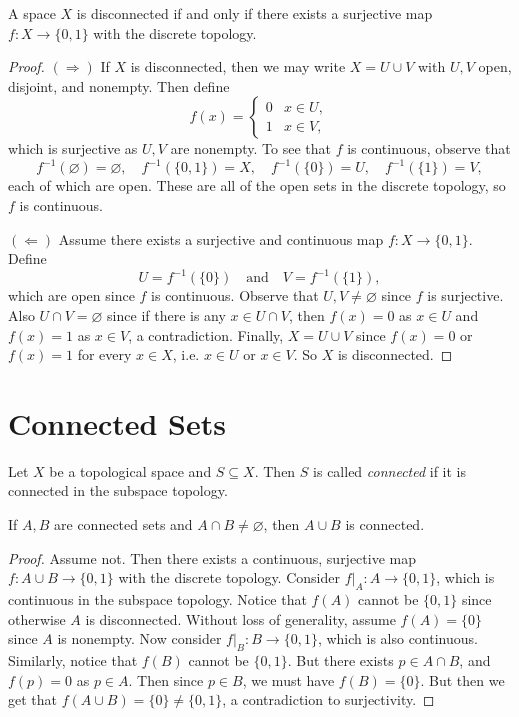 \begin{theorem}
  A space $X$ is disconnected if and only if
  there exists a surjective map
  $f : X \to \{0, 1\}$ with the discrete topology.
\end{theorem}

\begin{proof}
  $(\Rightarrow)$
  If $X$ is disconnected, then we may write
  $X = U \cup V$ with $U, V$ open, disjoint, and
  nonempty. Then define
  \[
    f(x) = \begin{cases}
      0 & x \in U, \\
      1 & x \in V,
    \end{cases}
  \]
  which is surjective as $U, V$ are nonempty. To
  see that $f$ is continuous, observe that
  \[
    f^{-1}(\varnothing) = \varnothing, \quad
    f^{-1}(\{0, 1\}) = X, \quad
    f^{-1}(\{0\}) = U, \quad
    f^{-1}(\{1\}) = V,
  \]
  each of which are open. These are all of
  the open sets in the discrete topology, so $f$ is
  continuous.

  $(\Leftarrow)$ Assume there exists a surjective
  and continuous map $f : X \to \{0, 1\}$. Define
  \[
    U = f^{-1}(\{0\}) \quad \text{and} \quad
    V = f^{-1}(\{1\}),
  \]
  which are open since $f$ is continuous. Observe
  that $U, V \ne \varnothing$ since $f$ is surjective.
  Also $U \cap V = \varnothing$ since if there is
  any $x \in U \cap V$, then
  $f(x) = 0$ as $x \in U$ and $f(x) = 1$ as $x \in V$,
  a contradiction.
  Finally, $X = U \cup V$ since $f(x) = 0$ or
  $f(x) = 1$ for every $x \in X$, i.e.
  $x \in U$ or $x \in V$. So $X$ is disconnected.
\end{proof}

\section{Connected Sets}
\begin{definition}
  Let $X$ be a topological space and $S \subseteq X$.
  Then $S$ is called
  \emph{connected} if it is connected in the
  subspace topology.
\end{definition}

\begin{theorem}
  \label{thm:union-connected}
  If $A, B$ are connected sets and
  $A \cap B \ne \varnothing$, then $A \cup B$
  is connected.
\end{theorem}

\begin{proof}
  Assume not. Then there exists a continuous,
  surjective map
  $f : A \cup B \to \{0, 1\}$ with the discrete
  topology. Consider $f|_A : A \to \{0, 1\}$,
  which is continuous in the subspace topology.
  Notice that $f(A)$ cannot be $\{0, 1\}$ since
  otherwise $A$ is disconnected. Without
  loss of generality, assume $f(A) = \{0\}$ since
  $A$ is nonempty. Now consider
  $f|_B : B \to \{0, 1\}$, which is also
  continuous. Similarly, notice that
  $f(B)$ cannot be $\{0, 1\}$. But
  there exists
  $p \in A \cap B$, and $f(p) = 0$ as $p \in A$.
  Then since $p \in B$, we must have $f(B) = \{0\}$.
  But then we get that $f(A \cup B) = \{0\} \ne \{0, 1\}$,
  a contradiction to surjectivity.
\end{proof}


